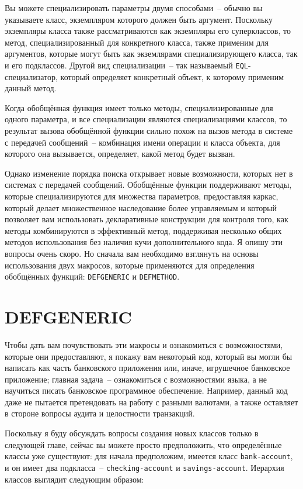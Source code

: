 Вы можете специализировать параметры двумя способами~-- обычно вы указываете класс,
экземпляром которого должен быть аргумент.  Поскольку экземпляры класса также
рассматриваются как экземпляры его суперклассов, то метод, специализированный для
конкретного класса, также применим для аргументов, которые могут быть как экземлярами
специализирующего класса, так и его подклассов.  Другой вид специализации~-- так
называемый \lstinline{EQL}-специализатор, который определяет конкретный объект, к которому
применим данный метод.

Когда обобщённая функция имеет только методы, специализированные для одного параметра, и
все специализации являются специализациями классов, то результат вызова обобщённой функции
сильно похож на вызов метода в системе с передачей сообщений~-- комбинация имени операции
и класса объекта, для которого она вызывается, определяет, какой метод будет вызван.

Однако изменение порядка поиска открывает новые возможности, которых нет в системах с
передачей сообщений.  Обобщённые функции поддерживают методы, которые специализируются для
множества параметров, предоставляя каркас, который делает множественное наследование более
управляемым и который позволяет вам использовать декларативные конструкции для контроля
того, как методы комбинируются в эффективный метод, поддерживая несколько общих методов
использования без наличия кучи дополнительного кода. Я опишу эти вопросы очень скоро.  Но
сначала вам необходимо взглянуть на основы использования двух макросов, которые
применяются для определения обобщённых функций: \lstinline{DEFGENERIC} и \lstinline{DEFMETHOD}.

\section{DEFGENERIC}

Чтобы дать вам почувствовать эти макросы и ознакомиться с возможностями, которые они
предоставляют, я покажу вам некоторый код, который вы могли бы написать как часть
банковского приложения или, иначе, игрушечное банковское приложение; главная задача~--
ознакомиться с возможностями языка, а не научиться писать банковское программное
обеспечение.  Например, данный код даже не пытается претендовать на работу с разными
валютами, а также оставляет в стороне вопросы аудита и целостности транзакций.

Поскольку я буду обсуждать вопросы создания новых классов только в следующей главе, сейчас
вы можете просто предположить, что определённые классы уже существуют: для начала
предположим, имеется класс \lstinline{bank-account}, и он имеет два подкласса~--
\lstinline{checking-account} и \lstinline{savings-account}.  Иерархия классов выглядит следующим
образом:

